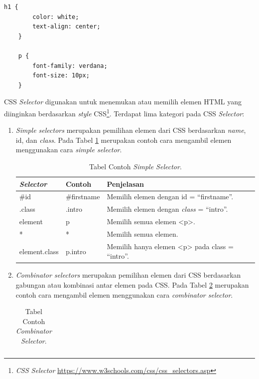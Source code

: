 \begin{lstlisting}[caption=Contoh kode CSS, label=kode:2:css]
	h1 {
		color: white;
		text-align: center;
	}

	p {
		font-family: verdana;
		font-size: 10px;
	}
\end{lstlisting}
\newpage
CSS \textit{Selector} digunakan untuk menemukan atau memilih elemen HTML yang diinginkan berdasarkan \textit{style} CSS\footnote{\textit{CSS Selector} \url{https://www.w3schools.com/css/css_selectors.asp}}. Terdapat lima kategori pada CSS \textit{Selector}:
\begin{enumerate}
	
	\item \textit{Simple selectors} merupakan pemilihan elemen dari CSS berdasarkan \textit{name}, id, dan \textit{class}. Pada Tabel \ref{table:simpel} merupakan contoh cara mengambil elemen menggunakan cara \textit{simple selector}.
	\begin{table}[h!]	\vspace{-0.9cm}
		\centering
		\caption{Tabel Contoh \textit{Simple Selector}.}
		\label{table:simpel}
		\begin{tabular}{ | m{8em} | m{3cm}| m{8cm} | } 
			\hline
			\textit{\textbf{Selector}}& Contoh & Penjelasan \\ 
			\hline
			\#id & 	\#firstname & Memilih elemen dengan id = ``firstname''. \\ 
			\hline
			.class & .intro & Memilih elemen dengan \textit{class} = ``intro''. \\ 
			\hline
			element & p & Memilih semua elemen <p>. \\ 
			\hline
			* & * & Memilih semua elemen.  \\ 
			\hline
			element.class & p.intro & Memilih hanya elemen <p> pada class = ``intro''.  \\ 
			\hline
		\end{tabular}
	\end{table}
	\item \textit{Combinator selectors} merupakan pemilihan elemen dari CSS berdasarkan gabungan atau kombinasi antar elemen pada CSS. Pada Tabel \ref{table:combinator} merupakan contoh cara mengambil elemen menggunakan cara \textit{combinator selector}.
	\begin{table}[h!]	\vspace{-0.4cm}
		\centering
		\caption{Tabel Contoh \textit{Combinator Selector}.}
		\label{table:combinator}
		\begin{tabular}{ | m{9em} | m{2cm}| m{8cm} | } 

\end{tabular}
\end{table}
\end{enumerate}

